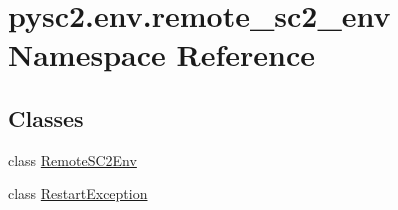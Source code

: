 \hypertarget{namespacepysc2_1_1env_1_1remote__sc2__env}{}\section{pysc2.\+env.\+remote\+\_\+sc2\+\_\+env Namespace Reference}
\label{namespacepysc2_1_1env_1_1remote__sc2__env}
\subsection*{Classes}
\begin{DoxyCompactItemize}
\item 
class \mbox{\hyperlink{classpysc2_1_1env_1_1remote__sc2__env_1_1_remote_s_c2_env}{Remote\+S\+C2\+Env}}
\item 
class \mbox{\hyperlink{classpysc2_1_1env_1_1remote__sc2__env_1_1_restart_exception}{Restart\+Exception}}
\end{DoxyCompactItemize}
